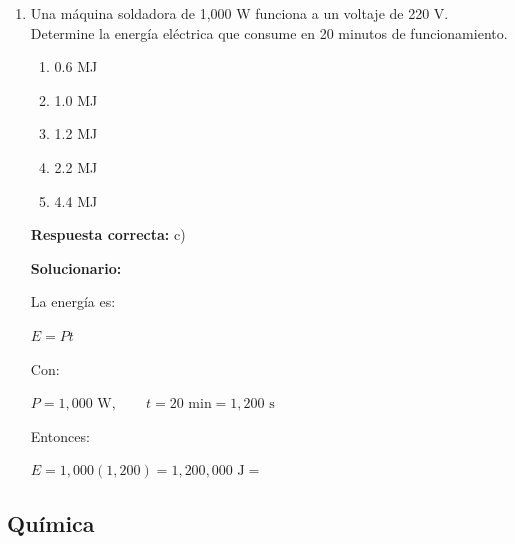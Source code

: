 \begin{enumerate}[resume]
	\vspace{2mm}
	\textbf{Solucionario:}
	
	En el punto más alto, la componente vertical es cero y solo queda la horizontal:
	
	$v_x=50\cos53^\circ$
	
	Usando:
	
	$\cos53^\circ=\dfrac35$
	
	se obtiene:
	
	$v_x=50\cdot \dfrac{3}{5}=$
	
	\vspace{6mm}
	
	
	\item Una máquina soldadora de 1,000 W funciona a un voltaje de 220 V. Determine la energía eléctrica que consume en 20 minutos de funcionamiento.
	\begin{enumerate}[label=\alph*)]
		\item 0.6 MJ
		\item 1.0 MJ
		\item 1.2 MJ
		\item 2.2 MJ
		\item 4.4 MJ
	\end{enumerate}
	\textbf{Respuesta correcta:} c)
	
	\vspace{2mm}
	\textbf{Solucionario:}
	
	La energía es:
	
	$E=Pt$
	
	Con:
	
	$P=1,000\text{ W},\qquad t=20\text{ min}=1,200\text{ s}$
	
	Entonces:
	
	$E=1,000(1,200)=1,200,000\text{ J}=$
	
	\vspace{6mm}
	
\end{enumerate}

  \subsection*{Química}

